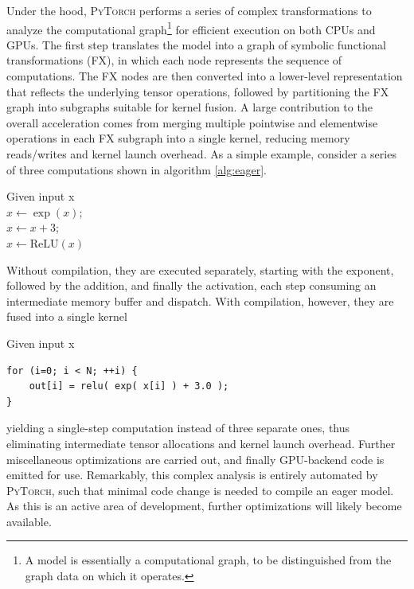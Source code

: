 Under the hood, \textsc{PyTorch} performs a series of complex transformations to analyze the computational graph\footnote{A model is essentially a computational graph, to be distinguished from the graph data on which it operates.} for efficient execution on both CPUs and GPUs. 
The first step translates the model into a graph of symbolic functional transformations (FX), in which each node represents the sequence of computations.
The FX nodes are then converted into a lower-level representation that reflects the underlying tensor operations, followed by partitioning the FX graph into subgraphs suitable for kernel fusion.
A large contribution to the overall acceleration comes from merging multiple pointwise and elementwise operations in each FX subgraph into a single kernel, reducing memory reads/writes and kernel launch overhead.
As a simple example, consider a series of three computations shown in algorithm \ref{alg:eager}. 
\begin{algorithm}
\caption{An example of eager computation }\label{alg:eager}
Given input x \\
$x\gets \exp(x)$;\\
$x \gets x + 3$; \\
$x \gets \mathrm{ReLU}(x)$
\end{algorithm}
Without compilation, they are executed separately, starting with the exponent, followed by the addition, and finally the activation, each step consuming an intermediate memory buffer and dispatch. 
With compilation, however, they are fused into a single kernel
\begin{algorithm}
\caption{Compiled computation }\label{alg:compiled}
Given input x \\
\begin{verbatim}
for (i=0; i < N; ++i) {
    out[i] = relu( exp( x[i] ) + 3.0 );
}
\end{verbatim}
\end{algorithm}
yielding a single-step computation instead of three separate ones, thus eliminating intermediate tensor allocations and kernel launch overhead.
Further miscellaneous optimizations are carried out, and finally GPU-backend code is emitted for use.
Remarkably, this complex analysis is entirely automated by \textsc{PyTorch}, such that minimal code change is needed to compile an eager model. 
As this is an active area of development, further optimizations will likely become available. 


